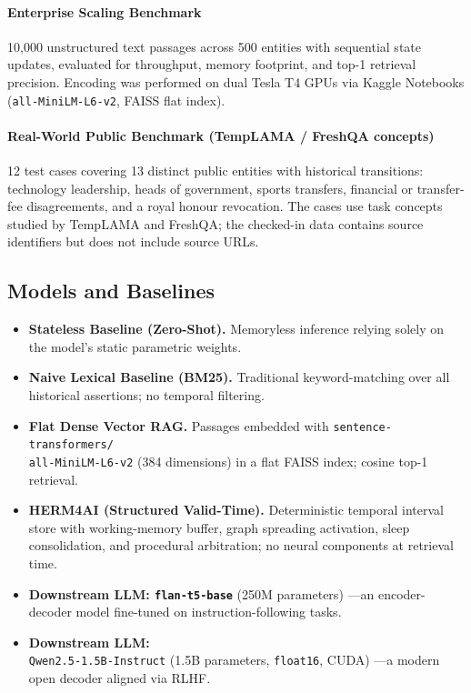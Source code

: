 \documentclass[11pt,a4paper,twocolumn]{article}
\newcommand{\herm}{\textsc{HERM4AI}}
\begin{document}
\paragraph{Enterprise Scaling Benchmark}
10{,}000 unstructured text passages across 500 entities with sequential
state updates, evaluated for throughput, memory footprint, and top-1
retrieval precision.  Encoding was performed on dual Tesla T4 GPUs via
Kaggle Notebooks (\texttt{all-MiniLM-L6-v2}, FAISS flat index).

\paragraph{Real-World Public Benchmark (TempLAMA / FreshQA concepts)}
12 test cases covering 13 distinct public entities with historical
transitions: technology leadership, heads of government, sports
transfers, financial or transfer-fee disagreements, and a royal honour
revocation. The cases use task concepts studied by TempLAMA and FreshQA;
the checked-in data contains source identifiers but does not include
source URLs.

\subsection{Models and Baselines}
\label{sec:baselines}

\begin{itemize}[leftmargin=*]
  \item \textbf{Stateless Baseline (Zero-Shot).}  Memoryless inference
        relying solely on the model's static parametric weights.
  \item \textbf{Naive Lexical Baseline (BM25).}  Traditional
        keyword-matching over all historical assertions; no temporal
        filtering.
  \item \textbf{Flat Dense Vector RAG.} Passages embedded with
\texttt{sentence-transformers/}\\
\texttt{all-MiniLM-L6-v2} (384 dimensions) in a flat FAISS
index; cosine top-1 retrieval.
  \item \textbf{\herm{} (Structured Valid-Time).}  Deterministic
        temporal interval store with working-memory buffer, graph
        spreading activation, sleep consolidation, and procedural
        arbitration; no neural components at retrieval time.
  \item \textbf{Downstream LLM: \texttt{flan-t5-base}} (250M
        parameters) \citep{chung2022flan}---an encoder-decoder model
        fine-tuned on instruction-following tasks.
  \item \textbf{Downstream LLM:}\\
\texttt{Qwen2.5-1.5B-Instruct}
(1.5B parameters, \texttt{float16}, CUDA)
\citep{qwen2024}---a modern open decoder aligned via RLHF.
\end{itemize}
\end{document}
